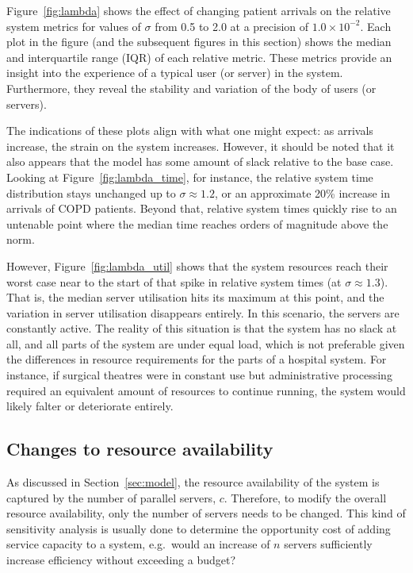 \documentclass[]{interact}
\theoremstyle{plain}%
\theoremstyle{definition}
\theoremstyle{remark}
\begin{document}
Figure~\ref{fig:lambda} shows the effect of changing patient arrivals
on the relative system metrics for values of \(\sigma\) from 0.5 to 2.0 at a
precision of \(1.0 \times 10^{-2}\). Each plot in the figure (and the subsequent
figures in this section) shows the median and interquartile range (IQR) of each
relative metric. These metrics provide an insight into the experience of a
typical user (or server) in the system. Furthermore, they reveal the stability
and variation of the body of users (or servers).

The indications of these plots align with what one might expect: as arrivals
increase, the strain on the system increases. However, it should be noted that
it also appears that the model has some amount of slack relative to the base
case. Looking at Figure~\ref{fig:lambda_time}, for instance, the relative system
time distribution stays unchanged up to \(\sigma \approx 1.2\), or an
approximate 20\% increase in arrivals of COPD patients. Beyond that, relative
system times quickly rise to an untenable point where the median time reaches
orders of magnitude above the norm.

However, Figure~\ref{fig:lambda_util} shows that the system resources reach
their worst case near to the start of that spike in relative system times (at
\(\sigma \approx 1.3\)). That is, the median server utilisation hits its maximum
at this point, and the variation in server utilisation disappears entirely. In
this scenario, the servers are constantly active. The reality of this situation
is that the system has no slack at all, and all parts of the system are under
equal load, which is not preferable given the differences in resource
requirements for the parts of a hospital system. For instance, if surgical
theatres were in constant use but administrative processing required an
equivalent amount of resources to continue running, the system would likely
falter or deteriorate entirely.


\subsection{Changes to resource availability}\label{subsec:resources}

As discussed in Section~\ref{sec:model}, the resource availability of the system
is captured by the number of parallel servers, \(c\). Therefore, to modify the
overall resource availability, only the number of servers needs to be changed.
This kind of sensitivity analysis is usually done to determine the opportunity
cost of adding service capacity to a system, e.g.\ would an increase of \(n\)
servers sufficiently increase efficiency without exceeding a budget?
\end{document}
